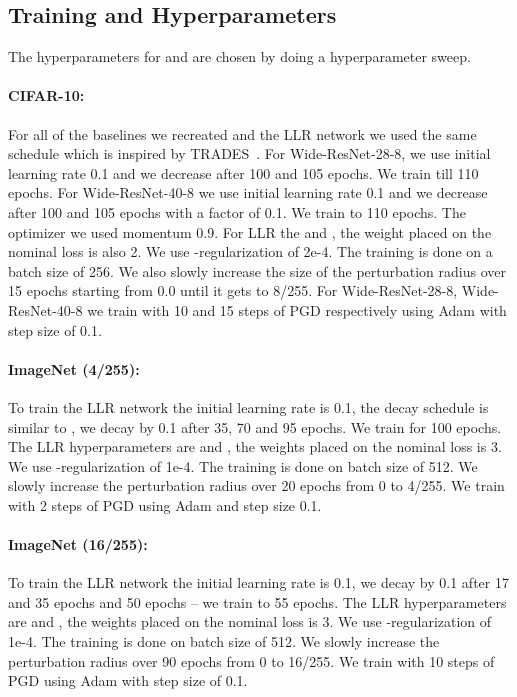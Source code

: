\documentclass{article}
\theoremstyle{plain}
\theoremstyle{definition}
\theoremstyle{remark}
\begin{document}
\subsection{Training and Hyperparameters}
The hyperparameters for  and  are chosen by doing a hyperparameter sweep. 
\paragraph{CIFAR-10:}For all of the baselines we recreated and the LLR network we used the same schedule which is inspired by TRADES~\citep{zhang2019theoretically}. For Wide-ResNet-28-8, we use initial learning rate 0.1 and we decrease after 100 and 105 epochs. We train till 110 epochs. For Wide-ResNet-40-8 we use initial learning rate 0.1 and we decrease after 100 and 105 epochs with a factor of 0.1. We train to 110 epochs. The optimizer we used momentum 0.9. For LLR the  and , the weight placed on the nominal loss  is also 2. We use -regularization of 2e-4. The training is done on a batch size of 256. We also slowly increase the size of the perturbation radius over 15 epochs starting from 0.0 until it gets to 8/255. For Wide-ResNet-28-8, Wide-ResNet-40-8 we train with 10 and 15 steps of PGD respectively using Adam with step size of 0.1. 

\paragraph{ImageNet (4/255):} To train the LLR network the initial learning rate is 0.1, the decay schedule is similar to \citep{xie2018feature}, we decay by 0.1 after 35, 70 and 95 epochs. We train for 100 epochs. The LLR hyperparameters are  and , the weights placed on the nominal loss is 3. We use -regularization of 1e-4. The training is done on batch size of 512. We slowly increase the perturbation radius over 20 epochs from 0 to 4/255. We train with 2 steps of PGD using Adam and step size 0.1. 

\paragraph{ImageNet (16/255):} To train the LLR network the initial learning rate is 0.1, we decay by 0.1 after 17 and 35 epochs and 50 epochs -- we train to 55 epochs. The LLR hyperparameters are  and , the weights placed on the nominal loss is 3. We use -regularization of 1e-4. The training is done on batch size of 512. We slowly increase the perturbation radius over 90 epochs from 0 to 16/255. We train with 10 steps of PGD using Adam with step size of 0.1. 
\end{document}
